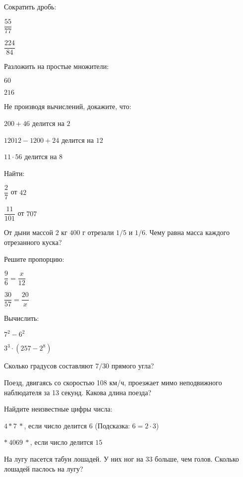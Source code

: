 \begin{listofex}
	\item Сократить дробь:
	\begin{enumcols}[itemcolumns=2]
		\item \( \dfrac{55}{77} \)
		\item \( \dfrac{224}{84} \)
	\end{enumcols}
	\item Разложить на простые множители:
	\begin{enumcols}[itemcolumns=2]
		\item \( 60 \)
		\item \( 216 \)
	\end{enumcols}
	\item Не производя вычислений, докажите, что:
	\begin{enumcols}[itemcolumns=1]
		\item \( 200+46 \) делится на \( 2 \)
		\item \( 12012-1200+24 \) делится на \( 12 \)
		\item \( 11\cdot56 \) делится на \( 8 \)
	\end{enumcols}
	\item Найти:
	\begin{enumcols}[itemcolumns=2]
		\item \( \dfrac{2}{7} \) от \( 42 \)
		\item \( \dfrac{11}{101} \) от \( 707 \)
	\end{enumcols}
	\item От дыни массой \( 2 \) кг \( 400 \) г отрезали \( 1/5 \) и \( 1/6 \). Чему равна масса каждого отрезанного куска?
	\item Решите пропорцию:
	\begin{enumcols}[itemcolumns=2]
		\item \( \dfrac{9}{6}=\dfrac{x}{12} \)
		\item \( \dfrac{30}{57}=\dfrac{20}{x} \)
	\end{enumcols}
	\item Вычислить:
	\begin{enumcols}[itemcolumns=2]
		\item \( 7^2-6^2 \)
		\item \( 3^3\cdot(257-2^8) \)
	\end{enumcols}
	\item Сколько градусов составляют \( 7/30 \) прямого угла?
	\item Поезд, двигаясь со скоростью 108 км/ч, проезжает мимо неподвижного наблюдателя за 13 секунд. Какова длина поезда?
	\item Найдите неизвестные цифры числа:
	\begin{enumcols}[itemcolumns=1]
		\item \( 4*7\:* \), если число делится \( 6 \) (Подсказка: \( 6=2\cdot3 \))
		\item \( *\:4069\:* \), если число делится \( 15 \)
	\end{enumcols}
	\item На лугу пасется табун лошадей. У них ног на \( 33 \) больше, чем голов. Сколько лошадей паслось на лугу?
\end{listofex}
%	
